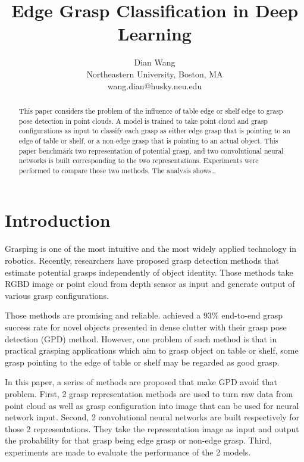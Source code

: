\documentclass[letterpaper]{article} %
\begin{document}
%

\title{Edge Grasp Classification in Deep Learning}
\author{Dian Wang\\
Northeastern University, Boston, MA\\
{wang.dian@husky.neu.edu}
}
\maketitle
\begin{abstract}
This paper considers the problem of the influence of table edge or shelf edge to grasp pose detection in point clouds. A model is trained to take point cloud and grasp configurations as input to classify each grasp as either edge grasp that is pointing to an edge of table or shelf, or a non-edge grasp that is pointing to an actual object. This paper benchmark two representation of potential grasp, and two convolutional neural networks is built corresponding to the two representations. Experiments were performed to compare those two methods. The analysis shows…
\end{abstract}

\section{Introduction}
\noindent Grasping is one of the most intuitive and the most widely applied technology in robotics. Recently, researchers have proposed grasp detection methods that estimate potential grasps independently of object identity. Those methods take RGBD image or point cloud from depth sensor as input and generate output of various grasp configurations. 

Those methods are promising and reliable. \cite{RN6} achieved a 93\% end-to-end grasp success rate for novel objects presented in dense clutter with their grasp pose detection (GPD) method. However, one problem of such method is that in practical grasping applications which aim to grasp object on table or shelf, some grasp pointing to the edge of table or shelf may be regarded as good grasp. 

In this paper, a series of methods are proposed that make GPD avoid that problem. First, 2 grasp representation methods are used to turn raw data from point cloud as well as grasp configuration into image that can be used for neural network input. Second, 2 convolutional neural networks are built respectively for those 2 representations. They take the representation image as input and output the probability for that grasp being edge grasp or non-edge grasp. Third, experiments are made to evaluate the performance of the 2 models.
\end{document}
